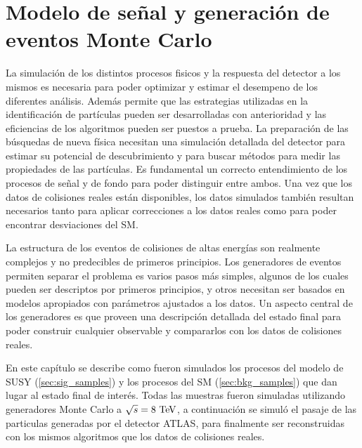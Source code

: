 \chapter{Modelo de señal y generación de eventos Monte Carlo}
\label{cap:simulaciones}

La simulación de los distintos procesos fisicos y la respuesta del detector a
los mismos es necesaria para poder optimizar y estimar el desempeno de los
diferentes análisis. Además permite que las estrategias utilizadas en la
identificación de partículas pueden ser desarrolladas con anterioridad y las
eficiencias de los algoritmos pueden ser puestos a prueba. La preparación de las
búsquedas de nueva física necesitan una simulación detallada del detector para
estimar su potencial de descubrimiento y para buscar métodos para medir las
propiedades de las partículas. Es fundamental un correcto entendimiento de los
procesos de señal y de fondo para poder distinguir entre ambos. Una vez que los
datos de colisiones reales están disponibles, los datos simulados también
resultan necesarios tanto para aplicar correcciones a los datos reales como para
poder encontrar desviaciones del SM.

La estructura de los eventos de colisiones de altas energías son realmente
complejos y no predecibles de primeros principios. Los generadores de eventos
permiten separar el problema es varios pasos más simples, algunos de los cuales
pueden ser descriptos por primeros principios, y otros necesitan ser basados en
modelos apropiados con parámetros ajustados a los datos. Un aspecto central de
los generadores es que proveen una descripción detallada del estado final para
poder construir cualquier observable y compararlos con los datos de colisiones
reales.

En este capítulo se describe como fueron simulados los procesos del modelo de
SUSY (\cref{sec:sig_samples}) y los procesos del SM (\cref{sec:bkg_samples}) que
dan lugar al estado final de interés. Todas las muestras fueron simuladas
utilizando generadores Monte Carlo a $\sqrt{s}=8\tev$, a continuación se simuló
el pasaje de las particulas generadas por el detector ATLAS, para finalmente ser
reconstruidas con los mismos algoritmos que los datos de colisiones reales.





